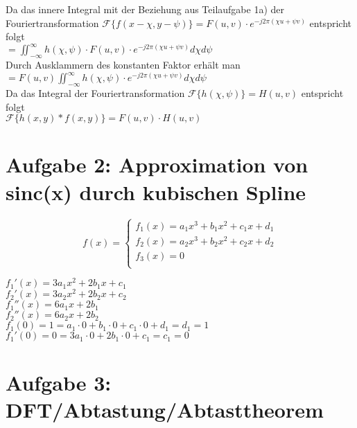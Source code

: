 \documentclass[a4paper,11pt,oneside]{scrartcl}
\begin{document}
Da das innere Integral mit der Beziehung aus Teilaufgabe 1a) der Fouriertransformation $\mathcal{F}\{f(x-\chi,y-\psi)\}=F(u,v)\cdot e^{-j2\pi(\chi u+\psi v)}$ entspricht folgt \\

$=\iint_{-\infty}^{\infty}h(\chi,\psi)\cdot F(u,v)\cdot e^{-j2\pi(\chi u+\psi v)} d\chi d\psi$ \\

Durch Ausklammern des konstanten Faktor erhält man \\

$=F(u,v)\iint_{-\infty}^{\infty}h(\chi,\psi)\cdot e^{-j2\pi(\chi u+\psi v)} d\chi d\psi$ \\

Da das Integral der Fouriertransformation $\mathcal{F}\{h(\chi,\psi)\}=H(u,v)$ entspricht folgt \\

$\mathcal{F}\{h(x,y)\ast f(x,y)\}=F(u,v)\cdot H(u,v)$

\newpage

\section*{Aufgabe 2: Approximation von sinc(x) durch kubischen Spline}

\begin{displaymath}
f(x) = 
 \left\{ 
  \begin{array}{l}
   f_1(x) = a_1x^3 + b_1x^2 + c_1x + d_1\\
   f_2(x) = a_2x^3 + b_2x^2 + c_2x + d_2\\
   f_3(x) = 0\\
  \end{array} 
   \right.
\end{displaymath}

$f_1'(x) = 3a_1x^2 + 2b_1x + c_1 $\\
$f_2'(x) = 3a_2x^2 + 2b_2x + c_2 $\\

$f_1''(x) = 6a_1x + 2b_1$\\
$f_2''(x) = 6a_2x + 2b_2$\\

$f_1(0) = 1 = a_1 \cdot 0 + b_1 \cdot 0 + c_1 \cdot 0 + d_1 = d_1 = 1$\\
$f_1'(0) = 0 = 3a_1 \cdot 0 + 2b_1 \cdot 0 + c_1 = c_1 = 0$\\

\newpage

\section*{Aufgabe 3: DFT/Abtastung/Abtasttheorem}
\end{document}
